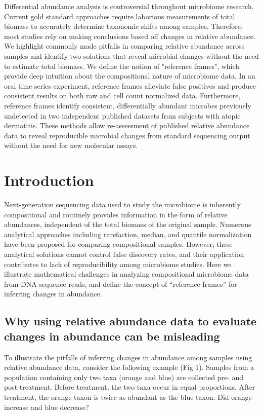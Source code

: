 Differential abundance analysis is controversial throughout microbiome research. Current gold standard
approaches require laborious measurements of total biomass to accurately determine taxonomic shifts
among samples. Therefore, most studies rely on making conclusions based off changes in relative abundance.
We highlight commonly made pitfalls in comparing relative abundance across samples and identify two solutions that
reveal microbial changes without the need to estimate total biomass. We define the notion of "reference frames",
which provide deep intuition about the compositional nature of microbiome data. In an oral time series experiment,
reference frames alleviate false positives and produce consistent results on both raw and cell count
normalized data. Furthermore, reference frames identify consistent, differentially abundant
microbes previously undetected in two independent published datasets from subjects with atopic dermatitis.
These methods allow re-assessment of published relative abundance data to reveal reproducible microbial changes
from standard sequencing output without the need for new molecular assays.

\section*{Introduction}
Next-generation sequencing data used to study the microbiome is inherently compositional and routinely provides information in the form of relative abundances, independent of the total biomass of the original sample. Numerous analytical approaches including rarefaction\cite{Weiss2015-gn}, median\cite{Love2014-sn}, and quantile normalization\cite{Love2014-sn,Paulson2013-mm} have been proposed for comparing compositional samples. However, these analytical solutions cannot control false discovery rates\cite{Russel2018-na, Hawinkel2017-ax}, and their application contributes to lack of reproducibility among microbiome studies\cite{Gloor2015-zq}. Here we illustrate mathematical challenges in analyzing compositional microbiome data from DNA sequence reads, and define the concept of “reference frames” for inferring changes in abundance.

\subsection{Why using relative abundance data to evaluate changes in abundance can be misleading}
To illustrate the pitfalls of inferring changes in abundance among samples using relative abundance data, consider the following example (Fig 1). Samples from a population containing only two taxa (orange and blue) are collected pre- and post-treatment. Before treatment, the two taxa occur in equal proportions. After treatment, the orange taxon is twice as abundant as the blue taxon. Did orange increase and blue decrease?

